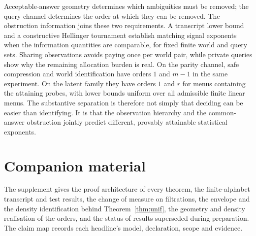 Acceptable-answer geometry determines which ambiguities must be removed; the query channel
determines the order at which they can be removed. The obstruction information joins these
two requirements. A transcript lower bound and a constructive Hellinger tournament establish
matching signal exponents when the information quantities are comparable, for fixed finite
world and query sets. Sharing observations avoids paying once per world pair, while private
queries show why the remaining allocation burden is real.
On the parity channel, safe compression and world identification have orders $1$ and $m-1$
in the same experiment. On the latent family they have orders $1$ and $r$ for menus containing
the attaining probes, with lower bounds uniform over all admissible finite linear menus.
The substantive separation is therefore not simply that deciding can be easier than
identifying. It is that the observation hierarchy and the common-answer obstruction jointly
predict different, provably attainable statistical exponents.

\section*{Companion material}
The supplement gives the proof architecture of every theorem, the finite-alphabet transcript and
test results, the change of measure on filtrations, the envelope and the density identification
behind Theorem~\ref{thm:unif}, the geometry and density realisation of the orders, and the status
of results superseded during preparation. The claim map records each headline's model,
declaration, scope and evidence.

